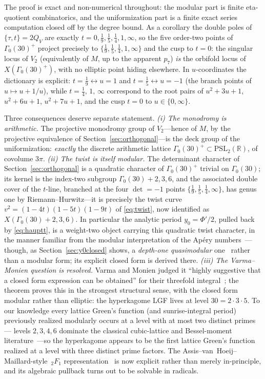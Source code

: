 \documentclass[11pt]{article}
\theoremstyle{plain}
\theoremstyle{remark}
\begin{document}
The proof is exact and non-numerical throughout: the modular part is finite eta-quotient combinatorics, and
the uniformization part is a finite exact series computation closed off by the degree bound. As a corollary
the double poles of $\{\tau,t\}=2Q_V$ are exactly $t=0,\tfrac19,\tfrac15,\tfrac14,1,\infty$, so the five
order-two points of $\Gamma_0(30)^+$ project precisely to $\{\tfrac19,\tfrac15,\tfrac14,1,\infty\}$ and the
cusp to $t=0$: the singular locus of $V_2$ (equivalently of $M$, up to the apparent $p_7$) \emph{is} the
orbifold locus of $X(\Gamma_0(30)^+)$, with no elliptic point hiding elsewhere. In $u$-coordinates the
dictionary is explicit: $t=\tfrac19\leftrightarrow u=1$ and $t=\tfrac15\leftrightarrow u=-1$ (the branch
points of $u\mapsto u+1/u$), while $t=\tfrac14,\,1,\,\infty$ correspond to the root pairs of $u^2+3u+1$,
$u^2+6u+1$, $u^2+7u+1$, and the cusp $t=0$ to $u\in\{0,\infty\}$.

Three consequences deserve separate statement. \emph{(i) The monodromy is arithmetic.} The projective
monodromy group of $V_2$---hence of $M$, by the projective equivalence of Section~\ref{sec:orthogonal}---is the
deck group of the uniformization: \emph{exactly} the discrete arithmetic lattice
$\Gamma_0(30)^+\subset\mathrm{PSL}_2(\mathbb{R})$, of covolume $3\pi$. \emph{(ii) The twist is itself
modular.} The determinant character of Section~\ref{sec:orthogonal} is a quadratic character of
$\Gamma_0(30)^+$ trivial on $\Gamma_0(30)$; its kernel is the index-two subgroup $\Gamma_0(30){+}2,3,6$, and
the associated double cover of the $t$-line, branched at the four $\det=-1$ points
$\{\tfrac19,\tfrac15,\tfrac14,\infty\}$, has genus one by Riemann--Hurwitz---it is precisely the twist curve
$v^2=(1-4t)(1-5t)(1-9t)$ of \eqref{eq:twist}, now identified as $X(\Gamma_0(30){+}2,3,6)$. In particular
the analytic period $y_0=\Phi'/2$, pulled back by \eqref{eq:hauptt}, is a weight-two object carrying this
quadratic twist character, in the manner familiar from the modular interpretation of the Ap\'ery
numbers~\cite{Beukers1987}---though, as Section~\ref{sec:y0closed} shows, a \emph{depth-one quasimodular}
one~\cite{Zagier2008} rather than a modular form; its explicit closed form is derived there. \emph{(iii) The Varma--Monien question is resolved.} Varma and Monien judged it ``highly
suggestive that a closed form expression can be obtained'' for their threefold integral~\cite{VarmaMonien2013};
the theorem proves this in the strongest structural sense, with the closed form modular rather than elliptic:
the hyperkagome LGF lives at level $30=2\cdot3\cdot5$. To our knowledge every lattice Green's function (and
sunrise-integral period) previously realized modularly occurs at a level with at most two distinct primes---
levels $2,3,4,6$ dominate the classical cubic-lattice and Bessel-moment
literature~\cite{Broadhurst2016,BlochKerrVanhove2015}---so the hyperkagome appears to be the first lattice
Green's function realized at a level with three distinct prime factors. The
Assis--van~Hoeij--Maillard-style $\,_2F_1$ representation~\cite{AVM2016} is now explicit rather than merely
in-principle, and its algebraic pullback turns out to be solvable in radicals.
\end{document}
